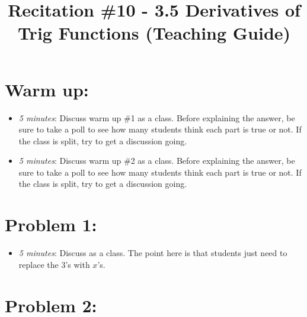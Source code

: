 \documentclass[handout,nooutcomes]{ximera}
\title{Recitation \#10 - 3.5 Derivatives of Trig Functions (Teaching Guide)}
\begin{document}
\begin{abstract}		\end{abstract}
\maketitle


\section*{Warm up:} 
	
	\begin{itemize}
	
	\item  \emph{5 minutes}:  Discuss warm up \#1 as a class.  Before explaining the answer, be sure to take a poll to see how many students think each part is true or not.  If the class is split, try to get a discussion going.
	
	\item  \emph{5 minutes}:  Discuss warm up \#2 as a class.  Before explaining the answer, be sure to take a poll to see how many students think each part is true or not.  If the class is split, try to get a discussion going.
	
	\end{itemize}


\section*{Problem 1:}

	\begin{itemize}
	
	\item  \emph{5 minutes}:  Discuss as a class.  The point here is that students just need to replace the $3$'s with $x$'s.
			
	\end{itemize}
	
	
	
\section*{Problem 2:}
\end{document}
